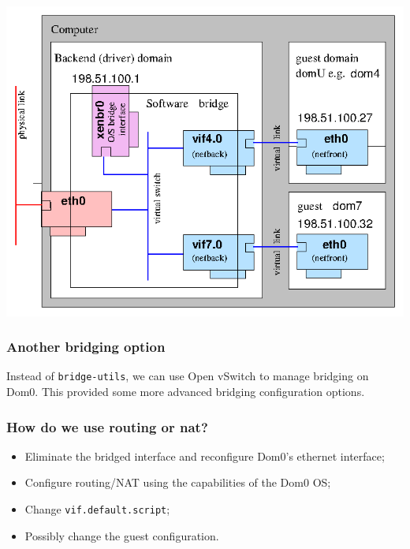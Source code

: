 \documentclass[10pt]{beamer}
\begin{document}
\begin{frame}

    \includegraphics[width=\linewidth]{network-bridge}
\end{frame}

\begin{frame}
  \frametitle{Another bridging option}
  
  Instead of \texttt{bridge-utils}, we can use Open vSwitch to manage bridging on Dom0.
  This provided some more advanced bridging configuration options.
  
  \end{frame}

\begin{frame}
  \frametitle{How do we use routing or nat?}

 
 
    \begin{itemize}
    \item Eliminate the bridged interface and reconfigure Dom0's ethernet interface;
    \item Configure routing/NAT using the capabilities of the Dom0 OS;
    \item Change \texttt{vif.default.script};
    \item Possibly change the guest configuration.
  \end{itemize}
\end{frame}
\end{document}
